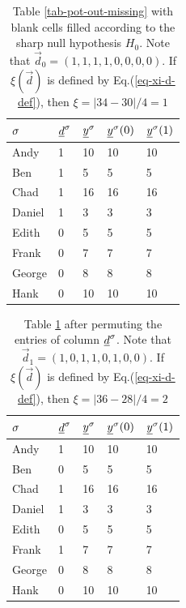 \begin{table}[h!]
\centering
\begin{tabular}{|l|l|l|l|l|}
\hline
\rowcolor[HTML]{ECF4FF} 
$\sigma$ & ${\underline{d}}^\sigma$ & ${\underline{y}}^\sigma$ & ${\underline{y}}^\sigma(0)$ & ${\underline{y}}^\sigma(1)$ \\ \hline
Andy & \cellcolor[HTML]{FFFFC7}1 & 10 & 10 & 10 \\ \hline
Ben & \cellcolor[HTML]{FFFFC7}1 & 5 & 5 & 5 \\ \hline
Chad & \cellcolor[HTML]{FFFFC7}1 & 16 & 16 & 16 \\ \hline
Daniel & \cellcolor[HTML]{FFFFC7}1 & 3 & 3 & 3 \\ \hline
Edith & 0 & 5 & 5 & 5 \\ \hline
Frank & 0 & 7 & 7 & 7 \\ \hline
George & 0 & 8 & 8 & 8 \\ \hline
Hank & 0 & 10 & 10 & 10 \\ \hline
\end{tabular}
\caption{
Table \ref{tab-pot-out-missing}
with blank cells
filled according to the
sharp null hypothesis $H_0$.
Note that
$\vec{d}_0=(1,1,1,1, 0,0,0,0)$. 
If  $\xi(\vec{d})$
is defined by Eq.(\ref{eq-xi-d-def}), then
$\xi=|34-30|/4=1$
}
\label{tab-pot-out-missing2}
\end{table}

\begin{table}[h!]
\centering
\begin{tabular}{|l|l|l|l|l|}
\hline
\rowcolor[HTML]{ECF4FF} 
$\sigma$ & ${\underline{d}}^\sigma$ & ${\underline{y}}^\sigma$ & ${\underline{y}}^\sigma(0)$ & ${\underline{y}}^\sigma(1)$ \\ \hline
Andy & \cellcolor[HTML]{FFFFC7}1 & 10 & 10 & 10 \\ \hline
Ben & 0 & 5 & 5 & 5 \\ \hline
Chad & \cellcolor[HTML]{FFFFC7}1 & 16 & 16 & 16 \\ \hline
Daniel & \cellcolor[HTML]{FFFFC7}1 & 3 & 3 & 3 \\ \hline
Edith & 0 & 5 & 5 & 5 \\ \hline
Frank & \cellcolor[HTML]{FFFFC7}1 & 7 & 7 & 7 \\ \hline
George & 0 & 8 & 8 & 8 \\ \hline
Hank & 0 & 10 & 10 & 10 \\ \hline
\end{tabular}
\caption{Table \ref{tab-pot-out-missing2}
after permuting the entries of column ${\underline{d}}^\sigma$.
Note that
$\vec{d}_1=(1,0,1,1,0,1,0,0)$.
If  $\xi(\vec{d})$
is defined by Eq.(\ref{eq-xi-d-def}), then
$\xi=|36-28|/4=2$}
\label{tab-pot-out-missing3}
\end{table}

